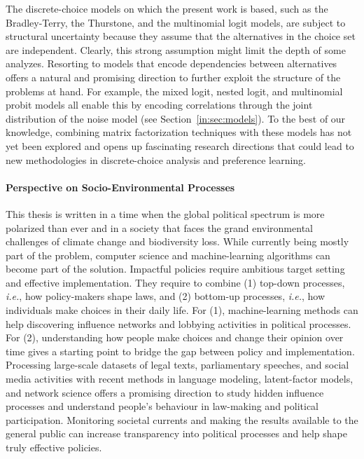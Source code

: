 The discrete-choice models on which the present work is based, such as the Bradley-Terry, the Thurstone, and the multinomial logit models, are subject to structural uncertainty because they assume that the alternatives in the choice set are independent.
Clearly, this strong assumption might limit the depth of some analyzes.
Resorting to models that encode dependencies between alternatives offers a natural and promising direction to further exploit the structure of the problems at hand.
For example, the mixed logit, nested logit, and multinomial probit models all enable this by encoding correlations through the joint distribution of the noise model (see Section~\ref{in:sec:models}).
To the best of our knowledge, combining matrix factorization techniques with these models has not yet been explored and opens up fascinating research directions that could lead to new methodologies in discrete-choice analysis and preference learning.

\paragraph{Perspective on Socio-Environmental Processes}

This thesis is written in a time when the global political spectrum is more polarized than ever and in a society that faces the grand environmental challenges of climate change and biodiversity loss.
While currently being mostly part of the problem, computer science and machine-learning algorithms can become part of the solution.
Impactful policies require ambitious target setting and effective implementation.
They require to combine (1) top-down processes, \textit{i.e.}, how policy-makers shape laws, and (2) bottom-up processes, \textit{i.e.}, how individuals make choices in their daily life.
For (1), machine-learning methods can help discovering influence networks and lobbying activities in political processes.
For (2), understanding how people make choices and change their opinion over time gives a starting point to bridge the gap between policy and implementation.
Processing large-scale datasets of legal texts, parliamentary speeches, and social media activities with recent methods in language modeling, latent-factor models, and network science offers a promising direction to study hidden influence processes and understand people's behaviour in law-making and political participation.
Monitoring societal currents and making the results available to the general public can increase transparency into political processes and help shape truly effective policies.

